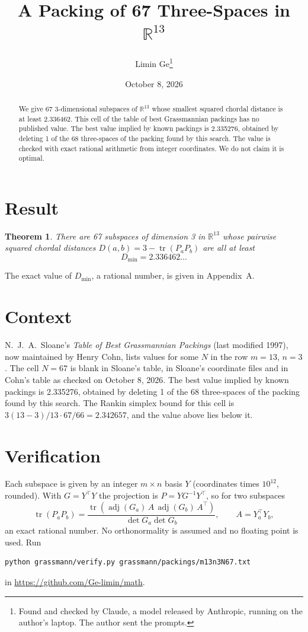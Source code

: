 \documentclass[11pt,a4paper]{article}
\title{A Packing of 67 Three-Spaces in $\mathbb{R}^{13}$}
\author{Limin Ge\thanks{Found and checked by Claude, a model released by Anthropic, running on the author's laptop. The author sent the prompts.}}
\date{October 8, 2026}
\newtheorem*{theorem}{Theorem}
\begin{document}
\maketitle
\begin{abstract}
We give 67 3-dimensional subspaces of $\mathbb{R}^{13}$ whose smallest squared chordal distance is at least 2.336462. This cell of the table of best Grassmannian packings has no published value. The best value implied by known packings is 2.335276, obtained by deleting 1 of the 68 three-spaces of the packing found by this search. The value is checked with exact rational arithmetic from integer coordinates. We do not claim it is optimal.
\end{abstract}

\section{Result}
\begin{theorem}
There are 67 subspaces of dimension 3 in $\mathbb{R}^{13}$ whose pairwise squared chordal distances $D(a,b) = 3 - \operatorname{tr}(P_aP_b)$ are all at least
\[ D_{\min} = 2.336462\ldots \]
\end{theorem}
The exact value of $D_{\min}$, a rational number, is given in Appendix~A.


\section{Context}
N.~J.~A.~Sloane's \emph{Table of Best Grassmannian Packings} (last modified 1997), now maintained by Henry Cohn, lists values for some $N$ in the row $m=13$, $n=3$. The cell $N=67$ is blank in Sloane's table, in Sloane's coordinate files and in Cohn's table as checked on October 8, 2026. The best value implied by known packings is 2.335276, obtained by deleting 1 of the 68 three-spaces of the packing found by this search. The Rankin simplex bound for this cell is $3(13-3)/13\cdot 67/66 = 2.342657$, and the value above lies below it.


\section{Verification}
Each subspace is given by an integer $m\times n$ basis $Y$ (coordinates times $10^{12}$, rounded). With $G=Y^\top Y$ the projection is $P=YG^{-1}Y^\top$, so for two subspaces
\[ \operatorname{tr}(P_aP_b)=\frac{\operatorname{tr}(\operatorname{adj}(G_a)\,A\,\operatorname{adj}(G_b)\,A^\top)}{\det G_a\det G_b},\qquad A=Y_a^\top Y_b, \]
an exact rational number. No orthonormality is assumed and no floating point is used. Run
\begin{verbatim}
python grassmann/verify.py grassmann/packings/m13n3N67.txt
\end{verbatim}
in \url{https://github.com/Ge-limin/math}.
\end{document}

